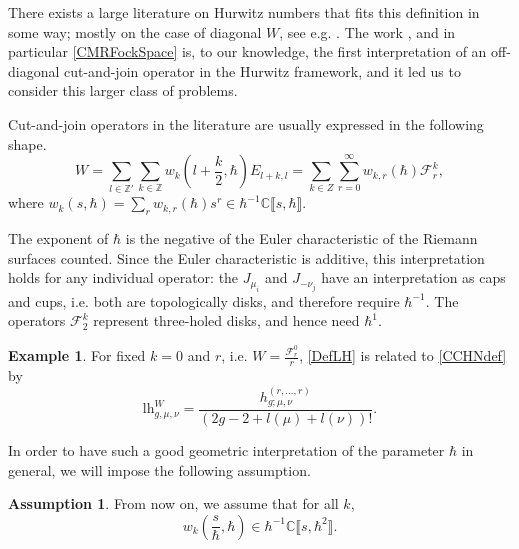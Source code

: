 \documentclass[10pt,a4paper,oneside,no-math,reqno]{amsart}%
\theoremstyle{plain}
\theoremstyle{definition}
\newtheorem{assumption}[theorem]{Assumption}
\newtheorem{example}[theorem]{Example}
\theoremstyle{remark}
\numberwithin{equation}{section}
\newcommand{\mb}[1]{\mathbb{#1}}
\newcommand{\mc}[1]{\mathcal{#1}}
\newcommand{\1}{\mathds{1}}
\newcommand{\C}{\mb{C}}
\newcommand{\Z}{\mb{Z}}
\newcommand{\<}{\langle}
\renewcommand{\>}{\rangle}
\newcommand{\lh}{\mathord{\mathrm{l\!h}}}
\begin{document}
There exists a large literature on Hurwitz numbers that fits this definition in some way; mostly on the case of diagonal $W$, see e.g. \cite{ALS16,BDKS22,BDKS24}. The work \cite{CMR25}, and in particular \cref{CMRFockSpace} is, to our knowledge, the first interpretation of an off-diagonal cut-and-join operator in the Hurwitz framework, and it led us to consider this larger class of problems.

Cut-and-join operators in the literature are usually expressed in the following shape.
\begin{equation}
	W
	=
	\sum_{l \in \Z'} \sum_{k \in \Z} w_k (l + \frac{k}{2}, \hbar)  E_{l + k,l} 
    =
    \sum_{k \in Z} \sum_{r = 0}^\infty w_{k,r} (\hbar ) \mc{F}_r^k ,
\end{equation}
where $ w_k (s, \hbar )  = \sum_r w_{k,r} (\hbar) s^r \in \hbar^{-1} \C \llbracket s, \hbar \rrbracket$.

The exponent of $ \hbar $ is the negative of the Euler characteristic of the Riemann surfaces counted. Since the Euler characteristic is additive, this interpretation holds for any individual operator: the $ J_{\mu_i}$ and $ J_{-\nu_j}$ have an interpretation as caps and cups, i.e. both are topologically disks, and therefore require $ \hbar^{-1}$. The operators $ \mc{F}_2^k$ represent three-holed disks, and hence need $ \hbar^1$.

\begin{example}\label{CCexample}
    For fixed $k = 0$ and $r$, i.e. $W = \frac{\mc{F}_r^0}{r}$, \cref{DefLH} is related to \cref{CCHNdef} by
    \begin{equation}
        \lh^W_{g,\mu,\nu}
        =
        \frac{h^{(r, \dotsc, r)}_{g;\mu, \nu}}{(2g-2+ l(\mu) + l(\nu))!}  .
    \end{equation}
\end{example}

In order to have such a good geometric interpretation of the parameter $ \hbar$ in general, we will impose the following assumption.

\begin{assumption}\label{TopologicalAssumption}
    From now on, we assume that for all $ k$,
	\begin{equation}
		w_k (\frac{s}{\hbar}, \hbar) \in \hbar^{-1} \C \llbracket s , \hbar^2 \rrbracket .
	\end{equation}
\end{assumption}
\end{document}
